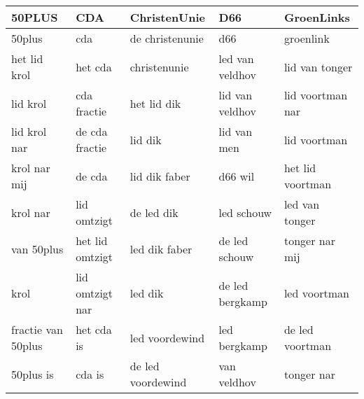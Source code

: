 \begin{tabular}{lllll}
\toprule
             50PLUS &              CDA &       ChristenUnie &              D66 &        GroenLinks \\
\midrule
             50plus &              cda &    de christenunie &              d66 &         groenlink \\
       het lid krol &          het cda &       christenunie &  led van veldhov &    lid van tonger \\
           lid krol &      cda fractie &        het lid dik &  lid van veldhov &  lid voortman nar \\
       lid krol nar &   de cda fractie &            lid dik &      lid van men &      lid voortman \\
       krol nar mij &           de cda &      lid dik faber &          d66 wil &  het lid voortman \\
           krol nar &      lid omtzigt &         de led dik &       led schouw &    led van tonger \\
         van 50plus &  het lid omtzigt &      led dik faber &    de led schouw &    tonger nar mij \\
               krol &  lid omtzigt nar &            led dik &  de led bergkamp &      led voortman \\
 fractie van 50plus &       het cda is &     led voordewind &     led bergkamp &   de led voortman \\
          50plus is &           cda is &  de led voordewind &      van veldhov &        tonger nar \\
\bottomrule
\end{tabular}
